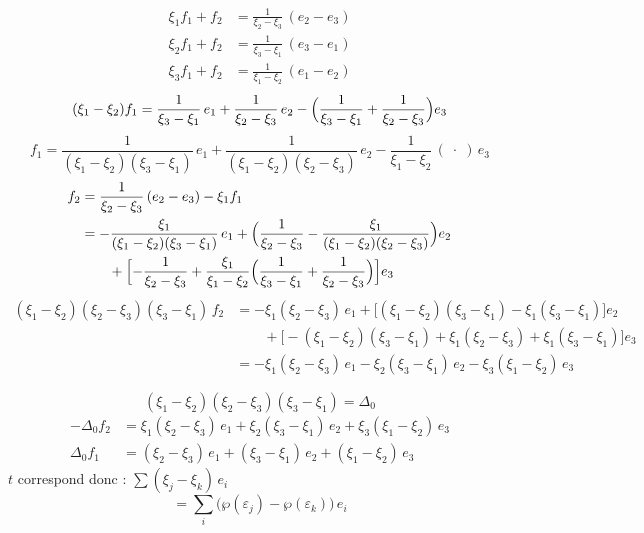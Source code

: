 \documentclass[11pt,a4paper]{article}
\begin{document}
\[
  \begin{aligned}
    \xi_1 f_1 + f_2 &= \frac{1}{\xi_2 - \xi_3}\,(e_2 - e_3) \\
    \xi_2 f_1 + f_2 &= \frac{1}{\xi_3 - \xi_1}\,(e_3 - e_1) \\
    \xi_3 f_1 + f_2 &= \frac{1}{\xi_1 - \xi_2}\,(e_1 - e_2)
  \end{aligned}
\]
\[
  (\xi_1 - \xi_2) f_1 = \frac{1}{\xi_3 - \xi_1}\, e_1 + \frac{1}{\xi_2 - \xi_3}\, e_2
  - \Bigl(\frac{1}{\xi_3 - \xi_1} + \frac{1}{\xi_2 - \xi_3}\Bigr) e_3
\]
\[
  f_1 = \frac{1}{(\xi_1 - \xi_2)(\xi_3 - \xi_1)}\, e_1
  + \frac{1}{(\xi_1 - \xi_2)(\xi_2 - \xi_3)}\, e_2
  - \frac{1}{\xi_1 - \xi_2}\,(\;\cdot\;)\, e_3
\]
\[
  \begin{aligned}
    f_2 &= \frac{1}{\xi_2 - \xi_3}\,(e_2 - e_3) - \xi_1 f_1 \\
    &= -\frac{\xi_1}{(\xi_1 - \xi_2)(\xi_3 - \xi_1)}\, e_1
      + \Bigl(\frac{1}{\xi_2 - \xi_3} - \frac{\xi_1}{(\xi_1 - \xi_2)(\xi_2 - \xi_3)}\Bigr) e_2 \\
    &\qquad + \Bigl[-\frac{1}{\xi_2 - \xi_3}
      + \frac{\xi_1}{\xi_1 - \xi_2}\Bigl(\frac{1}{\xi_3 - \xi_1} + \frac{1}{\xi_2 - \xi_3}\Bigr)\Bigr] e_3
  \end{aligned}
\]
\[
  \begin{aligned}
    (\xi_1 - \xi_2)(\xi_2 - \xi_3)(\xi_3 - \xi_1)\, f_2
    &= -\xi_1(\xi_2 - \xi_3)\, e_1
      + \bigl[(\xi_1 - \xi_2)(\xi_3 - \xi_1) - \xi_1(\xi_3 - \xi_1)\bigr] e_2 \\
    &\qquad + \bigl[-(\xi_1 - \xi_2)(\xi_3 - \xi_1) + \xi_1(\xi_2 - \xi_3) + \xi_1(\xi_3 - \xi_1)\bigr] e_3 \\
    &= -\xi_1(\xi_2 - \xi_3)\, e_1 - \xi_2(\xi_3 - \xi_1)\, e_2 - \xi_3(\xi_1 - \xi_2)\, e_3
  \end{aligned}
\]

\[
  (\xi_1 - \xi_2)(\xi_2 - \xi_3)(\xi_3 - \xi_1) = \Delta_0
\]
\[
  \boxed{\;
  \begin{aligned}
    -\Delta_0 f_2 &= \xi_1(\xi_2 - \xi_3)\, e_1 + \xi_2(\xi_3 - \xi_1)\, e_2 + \xi_3(\xi_1 - \xi_2)\, e_3 \\
    \Delta_0 f_1 &= (\xi_2 - \xi_3)\, e_1 + (\xi_3 - \xi_1)\, e_2 + (\xi_1 - \xi_2)\, e_3
  \end{aligned}\;}
\]
$t$ correspond donc : $\sum (\xi_j - \xi_k)\, e_i$
\[
  = \sum_i \bigl(\wp(\varepsilon_j) - \wp(\varepsilon_k)\bigr)\, e_i
\]
\end{document}
